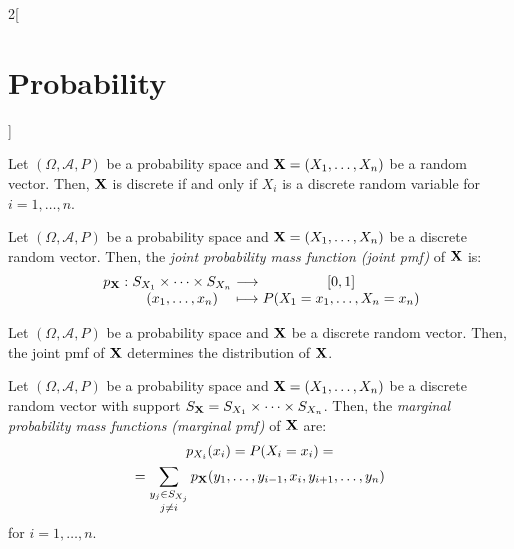 \documentclass[../../../main.tex]{subfiles}
\begin{document}
\begin{multicols}{2}[\section{Probability}]
\begin{definition}
  \end{definition}
  \begin{prop}
    Let $(\Omega,\mathcal{A},P)$ be a probability space and $\boldsymbol{\mathrm{X}}=(X_1,\ldots,X_n)$ be a random vector. Then, $\boldsymbol{\mathrm{X}}$ is discrete if and only if $X_i$ is a discrete random variable for $i=1,\ldots,n$.
  \end{prop}
  \begin{definition}
    Let $(\Omega,\mathcal{A},P)$ be a probability space and $\boldsymbol{\mathrm{X}}=(X_1,\ldots,X_n)$ be a discrete random vector. Then, the \textit{joint probability mass function (joint pmf)} of $\boldsymbol{\mathrm{X}}$ is:
    $$
      \begin{array}{r@{\hspace{0.5\tabcolsep}}c@{\hspace{0.5\tabcolsep}}c@{\hspace{0.5\tabcolsep}}c@{\hspace{0.5\tabcolsep}}c@{\hspace{0.5\tabcolsep}}c}
        p_{\vectorfunction{X}}: & S_{X_1}\times\cdots\times S_{X_n} & \longrightarrow & [0,1]                     \\
                                & (x_1,\ldots,x_n)                  & \longmapsto     & P(X_1=x_1,\ldots,X_n=x_n)
      \end{array}
    $$
  \end{definition}
  \begin{prop}
    Let $(\Omega,\mathcal{A},P)$ be a probability space and $\boldsymbol{\mathrm{X}}$ be a discrete random vector. Then, the joint pmf of $\boldsymbol{\mathrm{X}}$ determines the distribution of $\boldsymbol{\mathrm{X}}$.
  \end{prop}
  \begin{definition}
    Let $(\Omega,\mathcal{A},P)$ be a probability space and $\boldsymbol{\mathrm{X}}=(X_1,\ldots,X_n)$ be a discrete random vector with support $S_{\boldsymbol{\mathrm{X}}}=S_{X_1}\times\cdots\times S_{X_n}$. Then, the \textit{marginal probability mass functions (marginal pmf)} of $\boldsymbol{\mathrm{X}}$ are:
    \begin{multline*}
      p_{X_i}(x_i)=P(X_i=x_i)=\\=\sum_{\substack{y_j\in S_{X_j}\\j\ne i}}p_{\boldsymbol{\mathrm{X}}}(y_1,\ldots,y_{i-1},x_i,y_{i+1},\ldots,y_n)
    \end{multline*}
    for $i=1,\ldots,n$.
  \end{definition}

\end{multicols}
\end{document}
